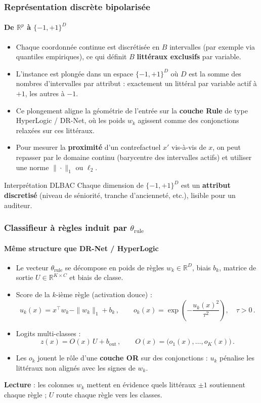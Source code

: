 \documentclass{beamer}
\begin{document}
\begin{frame}
\frametitle{Représentation discrète bipolarisée}
\framesubtitle{De $\mathbb{R}^p$ à $\{-1,+1\}^D$}

\begin{itemize}
    \item Chaque coordonnée continue est discrétisée en $B$ intervalles (par exemple via quantiles empiriques), ce qui définit $B$ \textbf{littéraux exclusifs} par variable.
    \item L'instance est plongée dans un espace $\{-1,+1\}^D$ où $D$ est la somme des nombres d'intervalles par attribut : exactement un littéral par variable actif à $+1$, les autres à $-1$.
    \item Ce plongement aligne la géométrie de l'entrée sur la \textbf{couche Rule} de type HyperLogic / DR-Net, où les poids $w_k$ agissent comme des conjonctions relaxées sur ces littéraux.
    \item Pour mesurer la \textbf{proximité} d'un contrefactuel $x'$ vis-à-vis de $x$, on peut repasser par le domaine continu (barycentre des intervalles actifs) et utiliser une norme $\|\cdot\|_1$ ou $\ell_2$.
\end{itemize}

\begin{block}{Interprétation DLBAC}
Chaque dimension de $\{-1,+1\}^D$ est un \textbf{attribut discretisé} (niveau de séniorité, tranche d'ancienneté, etc.), lisible pour un auditeur.
\end{block}

\end{frame}

\begin{frame}
\frametitle{Classifieur à règles induit par $\theta_{\text{rule}}$}
\framesubtitle{Même structure que DR-Net / HyperLogic}

\begin{itemize}
    \item Le vecteur $\theta_{\text{rule}}$ se décompose en poids de règles $w_k \in \mathbb{R}^D$, biais $b_k$, matrice de sortie $U \in \mathbb{R}^{K \times C}$ et biais de classe.
    \item Score de la $k$-ième règle (activation douce) :
    \[
    u_k(x) = x^\top w_k - \|w_k\|_1 + b_k\,, \qquad
    o_k(x) = \exp\!\left(-\frac{u_k(x)^2}{\tau^2}\right), \quad \tau > 0\,.
    \]
    \item Logits multi-classes :
    \[
    z(x) = O(x)\, U + b_{\text{out}}\,, \qquad O(x) = \bigl(o_1(x),\ldots,o_K(x)\bigr)\,.
    \]
    \item Les $o_k$ jouent le rôle d'une \textbf{couche OR} sur des conjonctions : $u_k$ pénalise les littéraux non alignés avec les signes de $w_k$.
\end{itemize}

\begin{center}
\textbf{Lecture} : les colonnes $w_k$ mettent en évidence quels littéraux $\pm 1$ soutiennent chaque règle ; $U$ route chaque règle vers les classes.
\end{center}

\end{frame}
\end{document}

